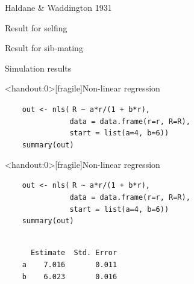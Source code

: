 \documentclass[aspectratio=169,12pt,t]{beamer}
\begin{document}
\begin{frame}[c]{Haldane \& Waddington 1931}



\note{
}

\end{frame}


\begin{frame}[c]{Result for selfing}



\note{
}

\end{frame}


\begin{frame}[c]{Result for sib-mating}



\note{
}

\end{frame}


\begin{frame}[c]{Simulation results}

\note{
}

\end{frame}



\begin{frame}<handout:0>[fragile]{Non-linear regression}

\vspace{5mm}

{
\verb|    out <- nls(| {\tt \vhilit R \verb|~| a*r/(1 + b*r)}\verb|,| \\
\verb|               data = data.frame(r=r, R=R),| \\
\verb|               start = list(a=4, b=6))| \\
\verb|    summary(out)|
}


\note{
}

\end{frame}


\begin{frame}<handout:0>[fragile]{Non-linear regression}
\addtocounter{framenumber}{-1}

\vspace{5mm}

\verb|    out <- nls(| {\tt \vhilit R \verb|~| a*r/(1 + b*r)}\verb|,| \\
\verb|               data = data.frame(r=r, R=R),| \\
\verb|               start = list(a=4, b=6))| \\
\verb|    summary(out)|

\vspace{8mm}

{\hilit
\verb|                          | \\
\verb|      Estimate  Std. Error| \\
\verb|    a    7.016       0.011| \\
\verb|    b    6.023       0.016|
}


\note{
}

\end{frame}
\end{document}
